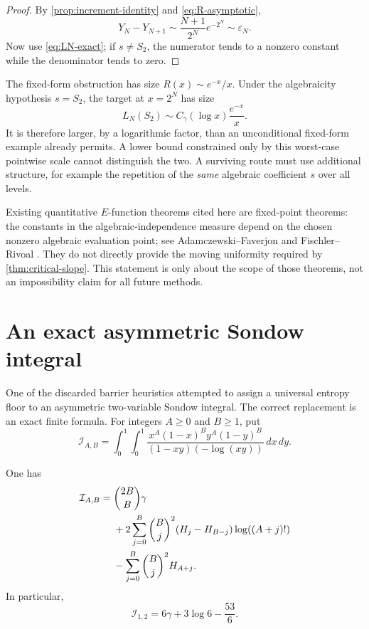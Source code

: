 \begin{proof}
By \cref{prop:increment-identity} and \eqref{eq:R-asymptotic},
\[
 Y_N-Y_{N+1}\sim\frac{N+1}{2^N}e^{-2^N}
 \sim\varepsilon_N.
\]
Now use \eqref{eq:LN-exact}; if \(s\ne S_2\), the numerator tends to a
nonzero constant while the denominator tends to zero.
\end{proof}

\begin{remark}
The fixed-form obstruction has size \(R(x)\sim e^{-x}/x\).  Under the
algebraicity hypothesis \(s=S_2\), the target at \(x=2^N\) has size
\[
 L_N(S_2)\sim C_\gamma(\log x)\frac{e^{-x}}x.
\]
It is therefore larger, by a logarithmic factor, than an unconditional
fixed-form example already permits.  A lower bound constrained only by this
worst-case pointwise scale cannot distinguish the two.  A surviving route
must use additional structure, for example the repetition of the \emph{same}
algebraic coefficient \(s\) over all levels.
\end{remark}

Existing quantitative \(E\)-function theorems cited here are fixed-point
theorems: the constants in the algebraic-independence measure depend on the
chosen nonzero algebraic evaluation point; see
Adamczewski--Faverjon \cite{AdamczewskiFaverjon2025} and
Fischler--Rivoal \cite{FischlerRivoal2024}.  They do not directly provide
the moving uniformity required by \cref{thm:critical-slope}.  This statement
is only about the scope of those theorems, not an impossibility claim for all
future methods.

\section{An exact asymmetric Sondow integral}
\label{sec:sondow}

One of the discarded barrier heuristics attempted to assign a universal
entropy floor to an asymmetric two-variable Sondow integral.  The correct
replacement is an exact finite formula.  For integers \(A\ge0\) and
\(B\ge1\), put
\begin{equation}\label{eq:Sondow-AB}
 \mathcal I_{A,B}=
 \int_0^1\!\!\int_0^1
 \frac{x^A(1-x)^B y^A(1-y)^B}
 {(1-xy)(-\log(xy))}\,dx\,dy.
\end{equation}

\begin{theorem}
\label{thm:Sondow-asymmetric}
One has
\begin{align}
 \mathcal I_{A,B}
 ={}&\binom{2B}{B}\gamma\notag\\
 &+2\sum_{j=0}^B\binom Bj^2
 (H_j-H_{B-j})\log((A+j)!)\notag\\
 &-\sum_{j=0}^B\binom Bj^2H_{A+j}.
 \label{eq:Sondow-exact}
\end{align}
In particular,
\begin{equation}\label{eq:Sondow-example}
 \mathcal I_{1,2}=6\gamma+3\log6-\frac{53}{6}.
\end{equation}
\end{theorem}

